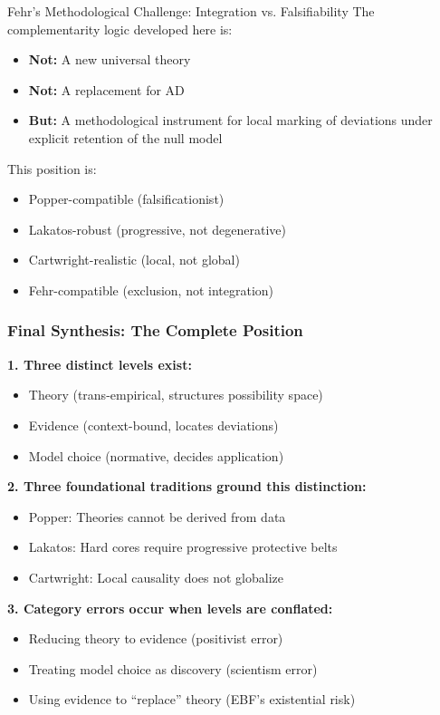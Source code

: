 \begin{chapter}{Fehr's Methodological Challenge: Integration vs. Falsifiability}
The complementarity logic developed here is:
\begin{itemize}[noitemsep]
    \item \textbf{Not:} A new universal theory
    \item \textbf{Not:} A replacement for AD
    \item \textbf{But:} A methodological instrument for local marking of deviations under explicit retention of the null model
\end{itemize}

This position is:
\begin{itemize}[noitemsep]
    \item Popper-compatible (falsificationist)
    \item Lakatos-robust (progressive, not degenerative)
    \item Cartwright-realistic (local, not global)
    \item Fehr-compatible (exclusion, not integration)
\end{itemize}

\subsubsection{Final Synthesis: The Complete Position}

\begin{tcolorbox}[colback=blue!5!white,colframe=blue!75!black,title=\textbf{The Complete Philosophy of Science Position}]

\textbf{1. Three distinct levels exist:}
\begin{itemize}[noitemsep]
    \item Theory (trans-empirical, structures possibility space)
    \item Evidence (context-bound, locates deviations)
    \item Model choice (normative, decides application)
\end{itemize}

\textbf{2. Three foundational traditions ground this distinction:}
\begin{itemize}[noitemsep]
    \item Popper: Theories cannot be derived from data
    \item Lakatos: Hard cores require progressive protective belts
    \item Cartwright: Local causality does not globalize
\end{itemize}

\textbf{3. Category errors occur when levels are conflated:}
\begin{itemize}[noitemsep]
    \item Reducing theory to evidence (positivist error)
    \item Treating model choice as discovery (scientism error)
    \item Using evidence to ``replace'' theory (EBF's existential risk)
\end{itemize}


\end{tcolorbox}
\end{chapter}
